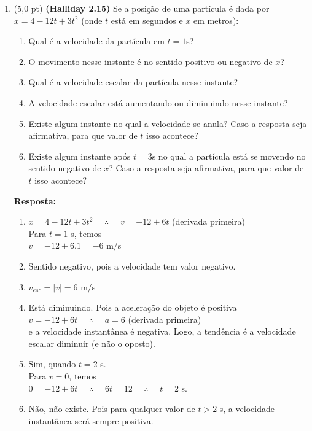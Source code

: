 \documentclass[12pt,a4paper,oneside]{article}
\begin{document}
\begin{enumerate}

	\item (5,0 pt) {\bf (Halliday 2.15)} Se a posição de uma partícula é dada por $x = 4 -12t  + 3t^2$ (onde $t$ está em segundos e $x$ em metros):
		\begin{enumerate}
			\item Qual é a velocidade da partícula em $t = 1$s? 
			\item O movimento nesse instante é no sentido positivo ou negativo de $x$? 
			\item Qual é a velocidade escalar da partícula nesse instante?
			\item A velocidade escalar está aumentando	ou diminuindo nesse instante?
			\item Existe algum instante no 	qual a velocidade se anula? Caso a resposta seja afirmativa, para que valor de $t$ isso acontece? 
			\item Existe algum instante após  $t  = 3$s	no qual a partícula está se movendo no sentido negativo de $x$?  Caso a resposta seja afirmativa, para que valor de $t$ isso acontece?
		\end{enumerate}
	
	\vspace{0.3cm}
	
	{ \color{blue} 
		{\bf Resposta:} 
			\begin{enumerate}
				\item $x = 4 -12t  + 3t^2$ \ \ 
					$\therefore$ \ \  $v = -12 + 6t$ (derivada primeira)\\
					Para $t = 1$ s, temos \\
					$v = -12 + 6.1 = -6$ m/s
				\item Sentido negativo, pois a velocidade tem valor negativo.
				\item $v_{esc} = |v| = 6$ m/s
				\item Está diminuindo. Pois a aceleração do objeto é positiva \\
				$v = -12 + 6t$ \ \ 
				$\therefore$ \ \  $a = 6$ (derivada primeira)\\
				e a velocidade instantânea é negativa. Logo, a tendência é a velocidade escalar diminuir (e não o oposto).
				\item Sim, quando $t = 2$ s. \\
					  Para $v=0$, temos\\
					  $0 = -12 + 6t$ \ \ $\therefore$ \ \ $6t = 12$ \ \ $\therefore$ \ \ $t = 2$ s.
				\item Não, não existe. Pois para qualquer valor de $t >  2$ s, a velocidade instantânea será sempre positiva.
			\end{enumerate}
	}
	

\end{enumerate}
\end{document}
